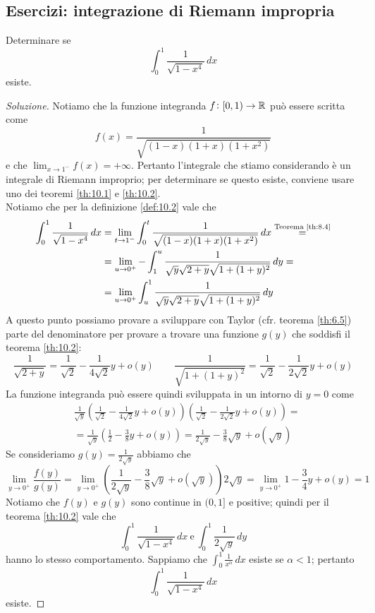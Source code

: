 \subsection{Esercizi: integrazione di Riemann impropria}
\begin{exercise}
    \label{ex:10.1}
    Determinare se
    \[
    \int_0^1 \frac{1}{\sqrt{1-x^4}}\, dx
    \]
    esiste.
\end{exercise}
\begin{proof}[Soluzione]
    Notiamo che la funzione integranda $f\colon[0,1)\to\amsbb{R}$ può essere scritta come
    \[
    f(x) = \frac{1}{\sqrt{(1-x)(1+x)(1+x^2)}}
    \]
    e che $\lim_{x\to 1^-} f(x) = +\infty$. Pertanto l'integrale che stiamo considerando è un integrale di Riemann improprio; per determinare se questo esiste, conviene usare uno dei teoremi \ref{th:10.1} e \ref{th:10.2}.\\
    Notiamo che per la definizione \ref{def:10.2} vale che
    \[
    \begin{split}
        \int_0^1 \frac{1}{\sqrt{1-x^4}}\, dx &= \lim_{t\to1^-} \int_0^t \frac{1}{\sqrt{(1-x)(1+x)(1+x^2)}}\, dx \overset{\text{Teorema \ref{th:8.4}}}{=} \\
        &=\lim_{u\to0^+} -\int_1^u \frac{1}{\sqrt{y}\sqrt{2+y}\sqrt{1+(1+y)^2}}\, dy = \\
        & = \lim_{u\to 0^+}\int_u^1 \frac{1}{\sqrt{y}\sqrt{2+y}\sqrt{1+(1+y)^2}}\, dy
    \end{split}
    \]
    A questo punto possiamo provare a sviluppare con Taylor (cfr. teorema \ref{th:6.5}) parte del denominatore per provare a trovare una funzione $g(y)$ che soddisfi il teorema \ref{th:10.2}:
    \[
    \frac{1}{\sqrt{2+y}} = \frac{1}{\sqrt{2}}-\frac{1}{4\sqrt{2}}y +o(y) \qquad \frac{1}{\sqrt{1+(1+y)^2}} = \frac{1}{\sqrt{2}}-\frac{1}{2\sqrt{2}}y +o(y)
    \]
    La funzione integranda può essere quindi sviluppata in un intorno di $y=0$ come
    \[
    \begin{split}
        & \frac{1}{\sqrt{y}}\left(\frac{1}{\sqrt{2}}-\frac{1}{4\sqrt{2}}y+o(y)\right)\left(\frac{1}{\sqrt{2}}-\frac{1}{2\sqrt{2}}y+o(y)\right) = \\
        & = \frac{1}{\sqrt{y}}\left(\frac{1}{2}-\frac{3}{8}y+o(y)\right) = \frac{1}{2\sqrt{y}}-\frac{3}{8}\sqrt{y}+o(\sqrt{y})
    \end{split}
    \]
    Se consideriamo $g(y) = \frac{1}{2\sqrt{y}}$ abbiamo che
    \[
    \lim_{y\to 0^+} \frac{f(y)}{g(y)} = \lim_{y\to 0^+} (\frac{1}{2\sqrt{y}}-\frac{3}{8}\sqrt{y}+o(\sqrt{y}))2\sqrt{y} = \lim_{y\to 0^+} 1 -\frac{3}{4}y+o(y) = 1
    \]
    Notiamo che $f(y)$ e $g(y)$ sono continue in $(0,1]$ e positive; quindi per il teorema \ref{th:10.2} vale che
    \[
    \int_0^1 \frac{1}{\sqrt{1-x^4}}\, dx \ \text{e} \ \int_0^1 \frac{1}{2\sqrt{y}}\, dy
    \]
    hanno lo stesso comportamento. Sappiamo che $\int_0^1 \frac{1}{x^\alpha}\, dx$ esiste se $\alpha<1$; pertanto 
    \[
    \int_0^1 \frac{1}{\sqrt{1-x^4}}\, dx
    \]
    esiste.
\end{proof}

